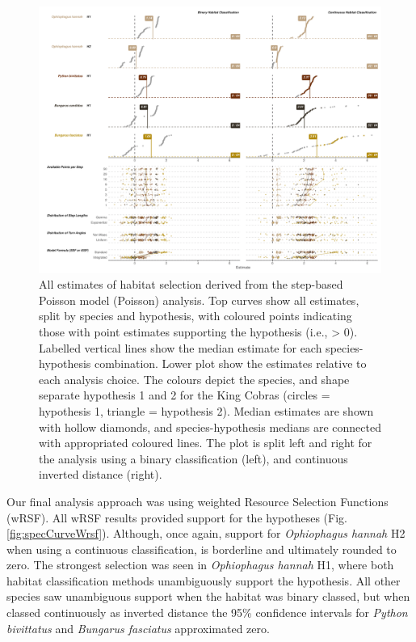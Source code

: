 \documentclass[10pt,a4paper]{article}
\begin{document}
\begin{figure}
\includegraphics[width=1\linewidth]{../../figures/specCurve_pois} \caption{All estimates of habitat selection derived from the step-based Poisson model (Poisson) analysis. Top curves show all estimates, split by species and hypothesis, with coloured points indicating those with point estimates supporting the hypothesis (i.e., > 0). Labelled vertical lines show the median estimate for each species-hypothesis combination. Lower plot show the estimates relative to each analysis choice. The colours depict the species, and shape separate hypothesis 1 and 2 for the King Cobras (circles = hypothesis 1, triangle = hypothesis 2). Median estimates are shown with hollow diamonds, and species-hypothesis medians are connected with appropriated coloured lines. The plot is split left and right for the analysis using a binary classification (left), and continuous inverted distance (right).}\label{fig:specCurvePois}
\end{figure}

Our final analysis approach was using weighted Resource Selection Functions (wRSF).
All wRSF results provided support for the hypotheses (Fig. \ref{fig:specCurveWrsf}).
Although, once again, support for \emph{Ophiophagus hannah} H2 when using a continuous classification, is borderline and ultimately rounded to zero.
The strongest selection was seen in \emph{Ophiophagus hannah} H1, where both habitat classification methods unambiguously support the hypothesis.
All other species saw unambiguous support when the habitat was binary classed, but when classed continuously as inverted distance the 95\% confidence intervals for \emph{Python bivittatus} and \emph{Bungarus fasciatus} approximated zero.
\end{document}
